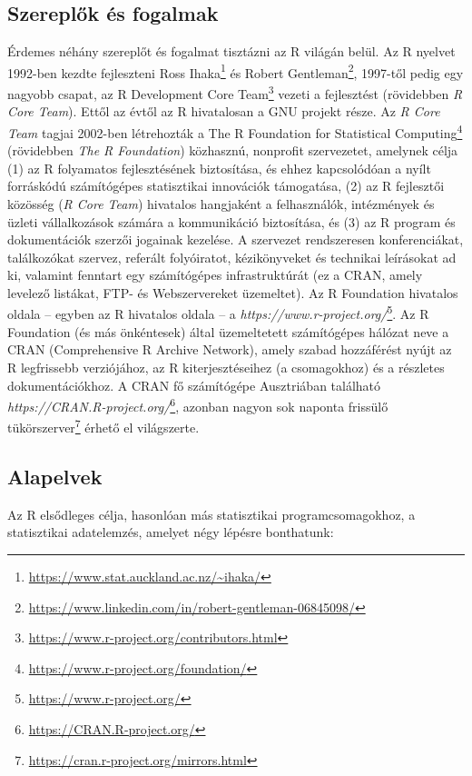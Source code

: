 \documentclass[
]{book}
\DeclareRobustCommand{\href}[2]{#2\footnote{\url{#1}}}
\renewcommand{\href}[2]{#2\footnote{\url{#1}}}
\begin{document}
\hypertarget{szereplux151k-uxe9s-fogalmak}{%
\subsection{Szereplők és fogalmak}\label{szereplux151k-uxe9s-fogalmak}}

Érdemes néhány szereplőt és fogalmat tisztázni az R világán belül. Az R nyelvet 1992-ben kezdte fejleszteni \href{https://www.stat.auckland.ac.nz/~ihaka/}{Ross Ihaka} és \href{https://www.linkedin.com/in/robert-gentleman-06845098/}{Robert Gentleman}, 1997-től pedig egy nagyobb csapat, az \href{https://www.r-project.org/contributors.html}{R Development Core Team} vezeti a fejlesztést (rövidebben \emph{R Core Team}). Ettől az évtől az R hivatalosan a GNU projekt része. Az \emph{R Core Team} tagjai 2002-ben létrehozták a \href{https://www.r-project.org/foundation/}{The R Foundation for Statistical Computing} (rövidebben \emph{The R Foundation}) közhasznú, nonprofit szervezetet, amelynek célja (1) az R folyamatos fejlesztésének biztosítása, és ehhez kapcsolódóan a nyílt forráskódú számítógépes statisztikai innovációk támogatása, (2) az R fejlesztői közösség (\emph{R Core Team}) hivatalos hangjaként a felhasználók, intézmények és üzleti vállalkozások számára a kommunikáció biztosítása, és (3) az R program és dokumentációk szerzői jogainak kezelése. A szervezet rendszeresen konferenciákat, találkozókat szervez, referált folyóiratot, kézikönyveket és technikai leírásokat ad ki, valamint fenntart egy számítógépes infrastruktúrát (ez a CRAN, amely levelező listákat, FTP- és Webszervereket üzemeltet). Az R Foundation hivatalos oldala -- egyben az R hivatalos oldala -- a \href{https://www.r-project.org/}{\emph{https://www.r-project.org/}}. Az R Foundation (és más önkéntesek) által üzemeltetett számítógépes hálózat neve a CRAN (Comprehensive R Archive Network), amely szabad hozzáférést nyújt az R legfrissebb verziójához, az R kiterjesztéseihez (a csomagokhoz) és a részletes dokumentációkhoz. A CRAN fő számítógépe Ausztriában található \href{https://CRAN.R-project.org/}{\emph{https://CRAN.R-project.org/}}, azonban nagyon sok naponta frissülő \href{https://cran.r-project.org/mirrors.html}{tükörszerver} érhető el világszerte.

\hypertarget{alapelvek}{%
\subsection{Alapelvek}\label{alapelvek}}

Az R elsődleges célja, hasonlóan más statisztikai programcsomagokhoz, a statisztikai adatelemzés, amelyet négy lépésre bonthatunk:
\end{document}
